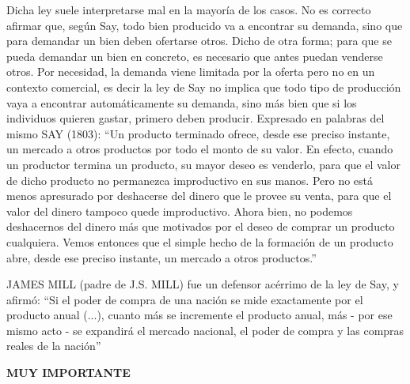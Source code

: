 \documentclass[10pt,a4paper]{article}
\begin{document}
Dicha ley suele interpretarse mal en la mayoría de los casos. No es correcto afirmar que, según Say, todo bien producido va a encontrar su demanda, sino que para demandar un bien deben ofertarse otros.
Dicho de otra forma; para que se pueda demandar un bien en concreto, es necesario que antes puedan venderse otros. Por necesidad, la demanda viene limitada por la oferta pero no en un contexto comercial, es decir la ley de Say no implica que todo tipo de producción vaya a encontrar automáticamente su demanda, sino más bien que si los individuos quieren gastar, primero deben producir.
Expresado en palabras del mismo SAY (1803):
“Un producto terminado ofrece, desde ese preciso instante, un mercado a otros productos por todo el monto de su valor. En efecto, cuando un productor termina un producto, su mayor deseo es venderlo, para que el valor de dicho producto no permanezca improductivo en sus manos. Pero no está menos apresurado por deshacerse del dinero que le provee su venta, para que el valor del dinero tampoco quede improductivo. Ahora bien, no podemos deshacernos del dinero más que motivados por el deseo de comprar un producto cualquiera. Vemos entonces que el simple hecho de la formación de un producto abre, desde ese preciso instante, un mercado a otros productos.”

JAMES MILL (padre de J.S. MILL) fue un defensor acérrimo de la ley de Say, y afirmó:
“Si el poder de compra de una nación se mide exactamente por el producto anual (...), cuanto más se incremente el producto anual, más - por ese mismo acto - se expandirá el mercado nacional, el poder de compra y las compras reales de la nación”


\textbf{MUY IMPORTANTE}
\end{document}
